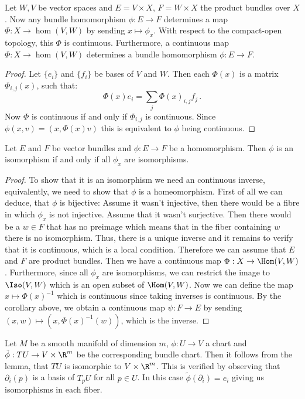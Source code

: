 \begin{definition}\label{def:vb-homomorphismBundle}
	Let $W,V$ be vector spaces and $E=V\times X$, $F=W\times X$ the product bundles over $X$. Now any bundle homomorphism $\phi:E\to F$ determines a map $\Phi:X\to \hom(V, W)$ by sending $x\mapsto \phi_x$. With respect to the compact-open topology, this $\Phi$ is continuous. Furthermore, a continuous map $\Phi:X \to \hom(V,W)$ determines a bundle homomorphism $\phi:E\to F$.
\end{definition}

\begin{proof}
	Let $\{e_i\}$ and $\{f_i\}$ be bases of $V$ and $W$. Then each $\Phi(x)$ is a matrix $\Phi_{i,j}(x)$, such that:
	\begin{equation*}
		\Phi(x)e_i=\sum_j\Phi(x)_{i,j}f_j\,.
	\end{equation*} Now $\Phi$ is continuous if and only if $\Phi_{i,j}$ is continuous. Since $\phi(x,v)=(x,\Phi(x)v)$ this is equivalent to $\phi$ being continuous. 
\end{proof}
\begin{lemma}\label{thm:vb-isomorphicVectorBundles}
	Let $E$ and $F$ be vector bundles and $\phi:E\to F$ be a homomorphism. Then $\phi$ is an isomorphism if and only if all $\phi_x$ are isomorphisms. 
\end{lemma}
\begin{proof}
	To show that it is an isomorphism we need an continuous inverse, equivalently, we need to show that $\phi$ is a homeomorphism. First of all we can deduce, that $\phi$ is bijective:
	Assume it wasn't injective, then there would be a fibre in which $\phi_x$ is not injective. Assume that it wasn't surjective. Then there would be a $w\in F$ that has no preimage which means that in the fiber containing $w$ there is no isomorphism. Thus, there is a unique inverse and it remains to verify that it is continuous, which is a local condition. Therefore we can assume that $E$ and $F$ are product bundles. Then we have a continuous map $\Phi:X\to \Hom(V,W)$. Furthermore, since all $\phi_x$ are isomorphisms, we can restrict the image to $\Iso(V,W)$ which is an open subset of $\Hom(V,W)$. Now we can define the map $x\mapsto \Phi(x)^{-1}$ which is continuous since taking inverses is continuous. By the corollary above, we obtain a continuous map $\psi:F\to E$ by sending $(x,w)\mapsto (x,\Phi(x)^{-1}(w))$, which is the inverse. 
\end{proof}
\begin{example}
	Let $M$ be a smooth manifold of dimension $m$, $\phi:U\to V$ a chart and $\tilde{\phi}:TU\to V\times \R^m$ be the corresponding bundle chart. Then it follows from the lemma, that $TU$ is isomorphic to $V\times \R^m$. This is verified by observing that $\partial_i(p)$ is a basis of $T_pU$ for all $p\in U$. In this case $\tilde{\phi}\left(\partial_i\right)=e_i$ giving us isomorphisms in each fiber. 
\end{example}
